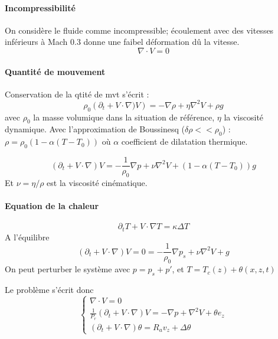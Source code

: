 \paragraph{Incompressibilité} On considère le fluide comme incompressible; écoulement avec des vitesses inférieurs à Mach 0.3 donne une faibel déformation dû  la vitesse. 
\begin{equation}
	\nabla \cdot V = 0
\end{equation}

\paragraph{Quantité de mouvement} Conservation de la qtité de mvt s'écrit :
\begin{equation}
	\rho_0 \left(\partial_t + V \cdot \nabla) V \right)= - \nabla \rho + \eta \nabla ^2 V + \rho g 
\end{equation}
avec $\rho_0$ la masse volumique dans la situation de référence, $\eta$ la viscosité dynamique. 
Avec l'approximation de Boussinesq ($\delta \rho << \rho_0$) : $\rho = \rho_0 (1- \alpha(T-T_0))$ où $\alpha$  coefficient de dilatation thermique. 
 
\begin{equation}
	\left(\partial_t + V \cdot \nabla \right) V = - \frac{1}{\rho_0} \nabla p + \nu \nabla ^2 V + \left( 1-\alpha(T-T_0)\right) g 
\end{equation}
Et $\nu = \eta / \rho$ est la viscosité cinématique. 

\paragraph{Equation de la chaleur}
\begin{equation}
	\partial_t T + V \cdot \nabla T = \kappa \Delta T
\end{equation}
A l'équilibre 
\begin{equation}
	\left(\partial_t + V \cdot \nabla \right) V = 0 = - \frac{1}{\rho_0} \nabla p_s + \nu \nabla ^2 V + g 
\end{equation}
On peut perturber le système avec $p = p_s + p'$, et $T = T_c(z) + \theta(x,z,t)$ 

Le problème s'écrit donc
\begin{equation}
	\begin{cases}
	\nabla \cdot V = 0 \\
	\frac{1}{P_r}\left(\partial_t + V \cdot \nabla \right) V = - \nabla p + \nabla ^2 V + \theta e_z \\	
	\left(\partial_t + V \cdot \nabla\right) \theta = R_a v_z + \Delta \theta
\end{cases}
\end{equation}

